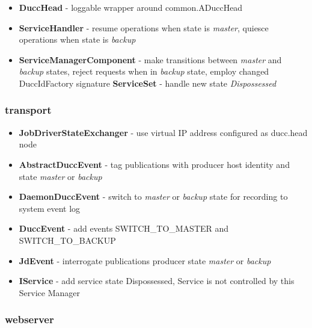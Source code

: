 \documentclass[letterpaper]{article}
\begin{document}
{\renewcommand\labelitemi{}
\begin{itemize}
  \item \textbf{DuccHead} - loggable wrapper around common.ADuccHead
  \item \textbf{ServiceHandler} - resume operations when state is {\em master}, quiesce operations when state is {\em backup}
  \item \textbf{ServiceManagerComponent} - make transitions between {\em master} and {\em backup} states, reject requests when in {\em backup} state, employ changed DuccIdFactory signature 
 \textbf{ServiceSet} - handle new state {\em Dispossessed}
\end{itemize}
}

\subsubsection{transport}

{\renewcommand\labelitemi{}
\begin{itemize}
  \item \textbf{JobDriverStateExchanger} - use virtual IP address configured as ducc.head node
  \item \textbf{AbstractDuccEvent} - tag publications with producer host identity and state {\em master} or {\em backup}
  \item \textbf{DaemonDuccEvent} - switch to {\em master} or {\em backup} state for recording to system event log
  \item \textbf{DuccEvent} - add events SWITCH\_TO\_MASTER and SWITCH\_TO\_BACKUP
  \item \textbf{JdEvent} - interrogate publications producer state {\em master} or {\em backup}
  \item \textbf{IService} - add service state Dispossessed, Service is not controlled by this Service Manager
\end{itemize}
}

\subsubsection{webserver}
\end{document}
